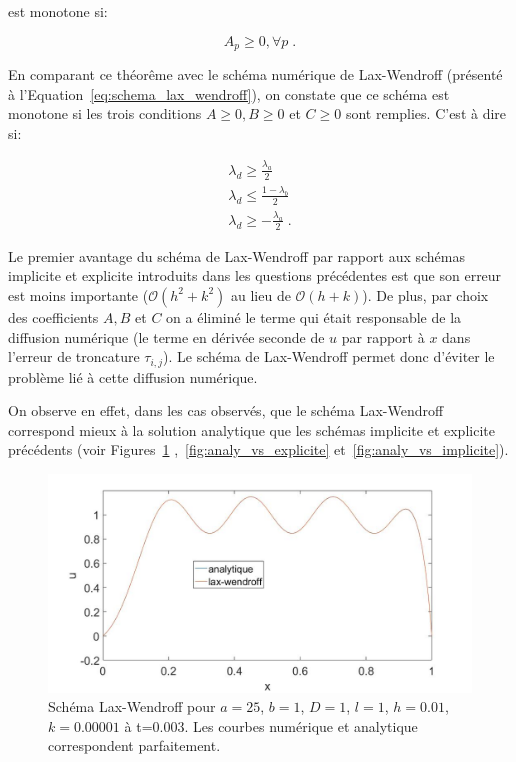 \documentclass[a4paper, 12pt]{report}
\begin{document}
est monotone si:

\begin{equation}
A_p \ge 0, \forall p\;.
\end{equation}

En comparant ce théorême avec le schéma numérique de Lax-Wendroff (présenté à
l'Equation~\ref{eq:schema_lax_wendroff}), on constate que ce schéma est
monotone si les trois conditions $A \ge 0, B \ge 0$ et $C \ge 0$ sont remplies. C'est
à dire si:

\begin{align}
  \lambda_d \ge \frac{\lambda_a}{2} \\
  \lambda_d \le \frac{1-\lambda_b}{2} \\
  \lambda_d \ge - \frac{\lambda_a}{2}\;.
\end{align}

Le premier avantage du schéma de Lax-Wendroff par rapport aux schémas implicite
et explicite introduits dans les questions précédentes est que son erreur
est moins importante ($\mathcal{O} \left (h^2 + k^2\right )$ au lieu de
$\mathcal{O} \left (h + k\right )$). De plus, par choix des coefficients
$A,B$ et $C$ on a éliminé le terme qui était responsable de la diffusion
numérique (le terme en dérivée seconde de $u$ par rapport à $x$ dans l'erreur
de troncature $\tau_{i,j}$). Le schéma de Lax-Wendroff permet donc d'éviter
le problème lié à cette diffusion numérique.

On observe en effet, dans les cas observés, que le schéma Lax-Wendroff correspond mieux à la solution analytique que les
schémas implicite et explicite précédents (voir Figures~\ref{fig:lax_wendroff_bien}
,~\ref{fig:analy_vs_explicite} et~\ref{fig:analy_vs_implicite}).

\begin{figure}[H]
  \center
  \includegraphics[scale=0.4]{images/lax_wendroff_marche_bien.jpg}
  \caption{Schéma Lax-Wendroff pour $a=25$, $b=1$, $D=1$,
  $l=1$, $h=0.01$, $k = 0.00001$ à t=$0.003$. Les courbes numérique et analytique
  correspondent parfaitement.}
  \label{fig:lax_wendroff_bien}
\end{figure}
\end{document}
